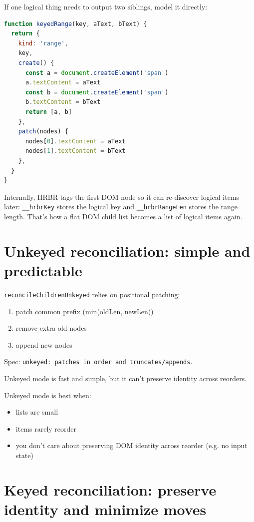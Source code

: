 If one logical thing needs to output two siblings, model it directly:

\begin{lstlisting}[language=JavaScript]
function keyedRange(key, aText, bText) {
  return {
    kind: 'range',
    key,
    create() {
      const a = document.createElement('span')
      a.textContent = aText
      const b = document.createElement('span')
      b.textContent = bText
      return [a, b]
    },
    patch(nodes) {
      nodes[0].textContent = aText
      nodes[1].textContent = bText
    },
  }
}
\end{lstlisting}

Internally, HRBR tags the first DOM node so it can re-discover logical items later:
  	\texttt{\_\_hrbrKey} stores the logical key and \texttt{\_\_hrbrRangeLen} stores the range length.
That’s how a flat DOM child list becomes a list of logical items again.

\section{Unkeyed reconciliation: simple and predictable}

\texttt{reconcileChildrenUnkeyed} relies on positional patching:

\begin{enumerate}
  \item patch common prefix (min(oldLen, newLen))
  \item remove extra old nodes
  \item append new nodes
\end{enumerate}

Spec: \texttt{unkeyed: patches in order and truncates/appends}.

Unkeyed mode is fast and simple, but it can’t preserve identity across reorders.

Unkeyed mode is best when:

\begin{itemize}
  \item lists are small
  \item items rarely reorder
  \item you don’t care about preserving DOM identity across reorder (e.g. no input state)
\end{itemize}

\section{Keyed reconciliation: preserve identity and minimize moves}

